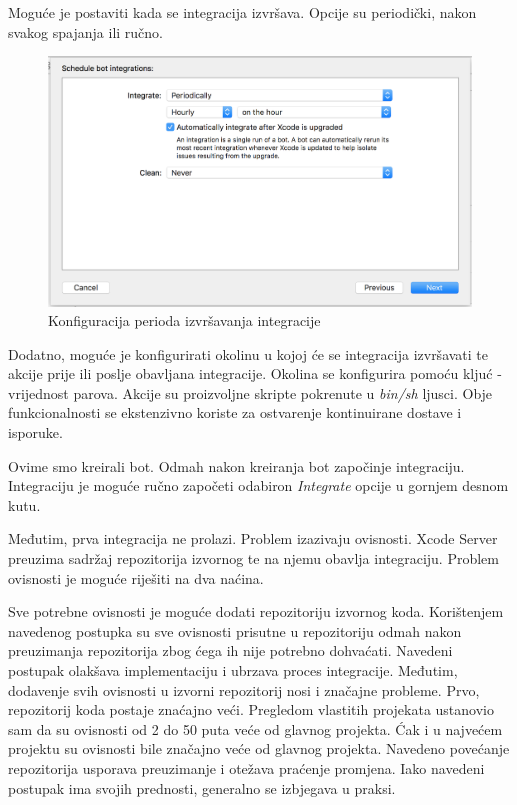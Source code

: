 \documentclass[times, utf8, diplomski, numeric]{fer}
\begin{document}
\begin{appendices}
Moguće je postaviti kada se integracija izvršava. Opcije su periodički, nakon svakog spajanja ili ručno.

\begin{figure}
    \centering
    \includegraphics[scale=0.5]{XcodeServerIntegrationPeriods}
    \caption{Konfiguracija perioda izvršavanja integracije}
    \label{fig:XcodeServerIntegrationPeriods}
\end{figure}

Dodatno, moguće je konfigurirati okolinu u kojoj će se integracija izvršavati te akcije prije ili poslje obavljana integracije. Okolina se konfigurira pomoću kljuć - vrijednost parova. Akcije su proizvoljne skripte pokrenute u \textit{bin/sh} ljusci. Obje funkcionalnosti se ekstenzivno koriste za ostvarenje kontinuirane dostave i isporuke.

Ovime smo kreirali bot. Odmah nakon kreiranja bot započinje integraciju. Integraciju je moguće ručno započeti odabiron \textit{Integrate} opcije u gornjem desnom kutu.

Međutim, prva integracija ne prolazi. Problem izazivaju ovisnosti. Xcode Server preuzima sadržaj repozitorija izvornog te na njemu obavlja integraciju. Problem ovisnosti je moguće riješiti na dva naćina.

Sve potrebne ovisnosti je moguće dodati repozitoriju izvornog koda. Korištenjem navedenog postupka su sve ovisnosti prisutne u repozitoriju odmah nakon preuzimanja repozitorija zbog ćega ih nije potrebno dohvaćati. Navedeni postupak olakšava implementaciju i ubrzava proces integracije. Međutim, dodavenje svih ovisnosti u izvorni repozitorij nosi i značajne probleme. Prvo, repozitorij koda postaje znaćajno veći. Pregledom vlastitih projekata ustanovio sam da su ovisnosti od 2 do 50 puta veće od glavnog projekta. Ćak i u najvećem projektu su ovisnosti bile značajno veće od glavnog projekta. Navedeno povećanje repozitorija usporava preuzimanje i otežava praćenje promjena. Iako navedeni postupak ima svojih prednosti, generalno se izbjegava u praksi.


\end{appendices}
\end{document}
